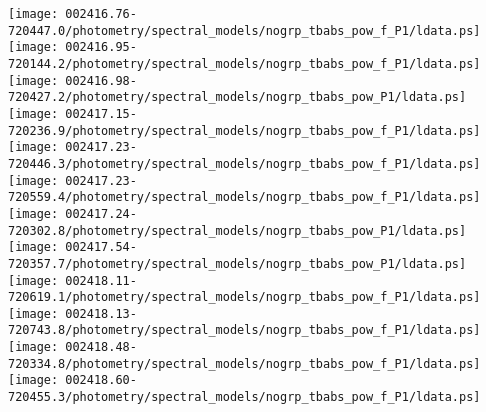 \documentclass{aastex}
\begin{document}
\begin{figure*}[!ht]
\centering
\texttt{[image: 002416.76-720447.0/photometry/spectral\_models/nogrp\_tbabs\_pow\_f\_P1/ldata.ps]} \hfill 
\texttt{[image: 002416.95-720144.2/photometry/spectral\_models/nogrp\_tbabs\_pow\_f\_P1/ldata.ps]} \hfill 
\texttt{[image: 002416.98-720427.2/photometry/spectral\_models/nogrp\_tbabs\_pow\_P1/ldata.ps]} \\ 
\vspace*{0.5in}
\texttt{[image: 002417.15-720236.9/photometry/spectral\_models/nogrp\_tbabs\_pow\_f\_P1/ldata.ps]} \hfill 
\texttt{[image: 002417.23-720446.3/photometry/spectral\_models/nogrp\_tbabs\_pow\_f\_P1/ldata.ps]} \hfill 
\texttt{[image: 002417.23-720559.4/photometry/spectral\_models/nogrp\_tbabs\_pow\_f\_P1/ldata.ps]} \\ 
\vspace*{0.5in}
\texttt{[image: 002417.24-720302.8/photometry/spectral\_models/nogrp\_tbabs\_pow\_P1/ldata.ps]} \hfill 
\texttt{[image: 002417.54-720357.7/photometry/spectral\_models/nogrp\_tbabs\_pow\_P1/ldata.ps]} \hfill 
\texttt{[image: 002418.11-720619.1/photometry/spectral\_models/nogrp\_tbabs\_pow\_f\_P1/ldata.ps]} \\ 
\vspace*{0.5in}
\texttt{[image: 002418.13-720743.8/photometry/spectral\_models/nogrp\_tbabs\_pow\_f\_P1/ldata.ps]} \hfill 
\texttt{[image: 002418.48-720334.8/photometry/spectral\_models/nogrp\_tbabs\_pow\_f\_P1/ldata.ps]} \hfill 
\texttt{[image: 002418.60-720455.3/photometry/spectral\_models/nogrp\_tbabs\_pow\_f\_P1/ldata.ps]} \\ 
\vspace*{0.5in}
\end{figure*}
\clearpage
\end{document}

